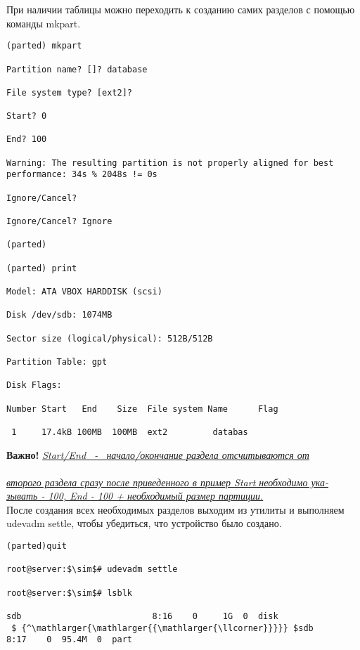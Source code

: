 \documentclass[14pt, a4paper]{article}
\begin{document}
\vspace{0.2cm}
При наличии таблицы можно переходить к созданию самих разделов с помощью команды \colorbox{backcolour}{mkpart}.
\vspace{0.3cm}

\begin{lstlisting}
(parted) mkpart

Partition name? []? database

File system type? [ext2]?

Start? 0

End? 100

Warning: The resulting partition is not properly aligned for best 
performance: 34s % 2048s != 0s

Ignore/Cancel?

Ignore/Cancel? Ignore

(parted)

(parted) print

Model: ATA VBOX HARDDISK (scsi)

Disk /dev/sdb: 1074MB

Sector size (logical/physical): 512B/512B

Partition Table: gpt

Disk Flags:

Number Start   End    Size  File system Name      Flag

 1     17.4kB 100MB  100MB  ext2         databas

\end{lstlisting}

\vspace{0.2cm}

\textbf{Важно!} \underline{\textit{Start/End \ - \ начало/окончание раздела отсчитываются от}} \\
\underline{} \\
\underline{\textit{второго раздела сразу после приведенного в пример Start необходимо ука-}} \\
\underline{\textit{зывать - 100, End - 100 + необходимый размер партиции.}}\\

После создания всех необходимых разделов выходим из утилиты и выполняем \colorbox{backcolour}{udevadm settle},
чтобы убедиться, что устройство было создано. 
\newpage 

\begin{lstlisting}
(parted)quit

root@server:$\sim$# udevadm settle

root@server:$\sim$# lsblk

sdb                          8:16    0     1G  0  disk
 $ {^\mathlarger{\mathlarger{{\mathlarger{\llcorner}}}}} $sdb                        8:17    0  95.4M  0  part
\end{lstlisting}
\end{document}

